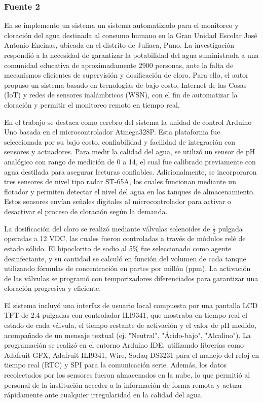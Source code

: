 \subsubsection{Fuente 2}

En \cite{Mamani2024} se implemento un sistema un sistema automatizado para el monitoreo y cloración del agua destinada al consumo humano en la Gran Unidad Escolar José Antonio Encinas, ubicada en el distrito de Juliaca, Puno. La investigación respondió a la necesidad de garantizar la potabilidad del agua suministrada a una comunidad educativa de aproximadamente 2900 personas, ante la falta de mecanismos eficientes de supervisión y dosificación de cloro. Para ello, el autor propuso un sistema basado en tecnologías de bajo costo, Internet de las Cosas (IoT) y redes de sensores inalámbricos (WSN), con el fin de automatizar la cloración y permitir el monitoreo remoto en tiempo real.

En el trabajo se destaca como cerebro del sistema la unidad de control Arduino Uno basada en el microcontrolador Atmega328P. Esta plataforma fue seleccionada por su bajo costo, confiabilidad y facilidad de integración con sensores y actuadores. Para medir la calidad del agua, se utilizó un sensor de pH analógico con rango de medición de 0 a 14, el cual fue calibrado previamente con agua destilada para asegurar lecturas confiables. Adicionalmente, se incorporaron tres sensores de nivel tipo radar ST-65A, los cuales funcionan mediante un flotador y permiten detectar el nivel del agua en los tanques de almacenamiento. Estos sensores envían señales digitales al microcontrolador para activar o desactivar el proceso de cloración según la demanda.

La dosificación del cloro se realizó mediante válvulas solenoides de $\frac{1}{2}$ pulgada operadas a 12 VDC, las cuales fueron controladas a través de módulos relé de estado sólido. El hipoclorito de sodio al 5\% fue seleccionado como agente desinfectante, y su cantidad se calculó en función del volumen de cada tanque utilizando fórmulas de concentración en partes por millón (ppm). La activación de las válvulas se programó con temporizadores diferenciados para garantizar una cloración progresiva y eficiente.

El sistema incluyó una interfaz de usuario local compuesta por una pantalla LCD TFT de 2.4 pulgadas con controlador ILI9341, que mostraba en tiempo real el estado de cada válvula, el tiempo restante de activación y el valor de pH medido, acompañado de un mensaje textual (ej. "Neutral", "Ácido-bajo", "Alcalino"). La programación se realizó en el entorno Arduino IDE, utilizando librerías como Adafruit GFX, Adafruit ILI9341, Wire, Sodaq DS3231 para el manejo del reloj en tiempo real (RTC) y SPI para la comunicación serie. Además, los datos recolectados por los sensores fueron almacenados en la nube, lo que permitió al personal de la institución acceder a la información de forma remota y actuar rápidamente ante cualquier irregularidad en la calidad del agua.

